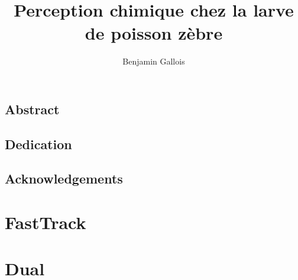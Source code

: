 \documentclass[12pt]{report}
\title{Perception chimique chez la larve de poisson zèbre}
\author{Benjamin Gallois}
\begin{document}
\maketitle
\chapter*{Abstract}

\chapter*{Dedication}

\chapter*{Acknowledgements}

\tableofcontents

\part{FastTrack}


\part{Dual}

\end{document}
